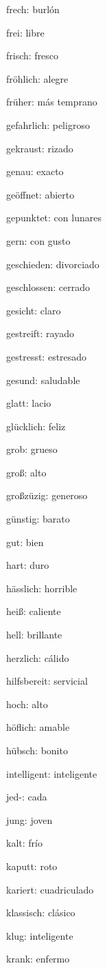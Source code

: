 \begin{multicols}{3}
\begin{myitemize}
\item frech: burlón
\item frei: libre
\item frisch: fresco
\item fröhlich: alegre
\item früher: más temprano
\item gefahrlich: peligroso
\item gekraust: rizado
\item genau: exacto
\item geöffnet: abierto
\item gepunktet: con lunares
\item gern: con gusto
\item geschieden: divorciado
\item geschlossen: cerrado
\item gesicht: claro
\item gestreift: rayado
\item gestresst: estresado
\item gesund: saludable
\item glatt: lacio
\item glücklich: feliz
\item grob: grueso
\item groß: alto
\item großzüzig: generoso
\item günstig: barato
\item gut: bien
\item hart: duro
\item hässlich: horrible
\item heiß: caliente
\item hell: brillante
\item herzlich: cálido
\item hilfsbereit: servicial
\item hoch: alto
\item höflich: amable
\item hübsch: bonito
\item intelligent: inteligente
\item jed-: cada
\item jung: joven
\item kalt: frío
\item kaputt: roto
\item kariert: cuadriculado
\item klassisch: clásico
\item klug: inteligente
\item krank: enfermo

\end{myitemize}
\end{multicols}
